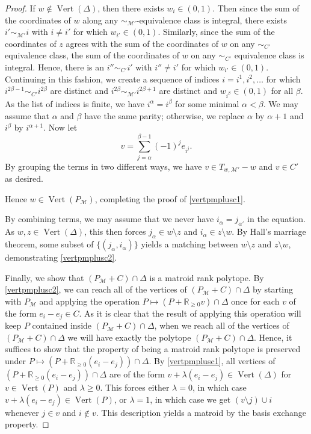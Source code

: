 \documentclass[12pt]{amsart}
\newcommand{\mb}{\mathbb}
\newcommand{\MM}{{\mathcal M}}
\newcommand{\Vt}{{\operatorname{Vert}}}
\theoremstyle{plain}
\theoremstyle{definition}
\theoremstyle{remark}
\begin{document}
\begin{proof}
If $w \not \in \Vt(\Delta)$, then there exists $w_{i} \in (0,1)$. Then since the sum of the coordinates of $w$ along any $\sim_{\MM'}$-equivalence class is integral, there exists $i' \sim_{\MM'} i$ with $i \ne i'$ for which $w_{i'} \in (0,1)$. Similarly, since the sum of the coordinates of $z$ agrees with the sum of the coordinates of $w$ on any $\sim_{C'}$ equivalence class, the sum of the coordinates of $w$ on any $\sim_{C'}$ equivalence class is integral. Hence, there is an $i''\sim_{C'}i'$ with $i'' \neq i'$ for which $w_{i'} \in (0,1)$. Continuing in this fashion, we create a sequence of indices $i=i^1,i^2,\ldots$ for which $i^{2\beta-1}\sim_{C'}i^{2\beta}$ are distinct and $i^{2\beta}\sim_{\MM'}i^{2\beta+1}$ are distinct and $w_{i^\beta} \in (0,1)$ for all $\beta$. As the list of indices is finite, we have $i^{\alpha} = i^{\beta}$ for some minimal $\alpha < \beta$. We may assume that $\alpha$ and $\beta$ have the same parity; otherwise, we replace $\alpha$ by $\alpha + 1$ and $i^\beta$ by $i^{\alpha + 1}$. Now let \[v = \sum_{j = \alpha}^{\beta -1} (-1)^j e_{i^j}.\] By grouping the terms in two different ways, we have $v \in T_{w,\MM'}-w$ and $v \in C'$ as desired.


Hence $w \in \Vt(P_\MM)$, completing the proof of \eqref{vertpmplusc1}.

By combining terms, we may assume that we never have $i_\alpha=j_{\alpha'}$ in the equation. As $w,z \in \Vt(\Delta)$, this then forces $j_\alpha \in w \setminus z$ and $i_\alpha \in z \setminus w$. By Hall's marriage theorem, some subset of  $\{(j_\alpha, i_\alpha)\}$ yields a matching between $w\setminus z$ and $z \setminus w$, demonstrating \eqref{vertpmplusc2}.

Finally, we show that $(P_\MM+C)\cap \Delta$ is a matroid rank polytope. By \eqref{vertpmplusc2}, we can reach all of the vertices of $(P_\MM+C)\cap \Delta$ by starting with $P_\MM$ and applying the operation $P \mapsto (P+\mb{R}_{\ge 0}v)\cap \Delta$ once for each $v$ of the form $e_i-e_j \in C$. As it is clear that the result of applying this operation will keep $P$ contained inside $(P_\MM+C)\cap \Delta$, when we reach all of the vertices of $(P_\MM+C)\cap \Delta$ we will have exactly the polytope $(P_\MM+C)\cap \Delta$. Hence, it suffices to show that the property of being a matroid rank polytope is preserved under $P \mapsto (P+\mb{R}_{\ge 0}(e_i-e_j))\cap \Delta$. By \eqref{vertpmplusc1}, all vertices of $(P+\mb{R}_{\ge 0}(e_i-e_j))\cap \Delta$ are of the form $v+\lambda(e_i-e_j) \in \Vt(\Delta)$ for $v \in \Vt(P)$ and $\lambda \geq 0$. This forces either $\lambda=0$, in which case $v+\lambda(e_i-e_j) \in \Vt(P)$, or $\lambda=1$, in which case we get $(v \setminus j)\cup i$ whenever $j \in v$ and $i \not \in v$. This description yields a matroid by the basis exchange property.
\end{proof}
\end{document}
